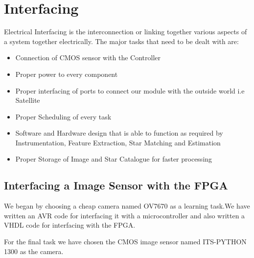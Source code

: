 \documentclass[../../main.tex]{subfiles}
\begin{document}
\section{Interfacing}
\thispagestyle{fancy}











Electrical Interfacing is the interconnection or linking together various aspects of a system together electrically. The major tasks that need to be dealt with are:

\begin{itemize}
    \item {Connection of CMOS sensor with the Controller}
    \item {Proper power to every component}
    \item {Proper interfacing of ports to connect our module with the outside world i.e Satellite}
    \item {Proper Scheduling of every task}
    \item {Software and Hardware design that is able to function as required by Instrumentation, Feature Extraction, Star Matching and Estimation}
    \item {Proper Storage of Image and Star Catalogue for faster processing}
\end{itemize}


\subsection{Interfacing a Image Sensor with the FPGA}
We began by choosing a cheap camera named OV7670 as a learning task.We have written an AVR code for interfacing it with a microcontroller and also written a VHDL code for interfacing with the FPGA.

For the final task we have chosen the CMOS image sensor named ITS-PYTHON 1300 as the camera.
\end{document}
